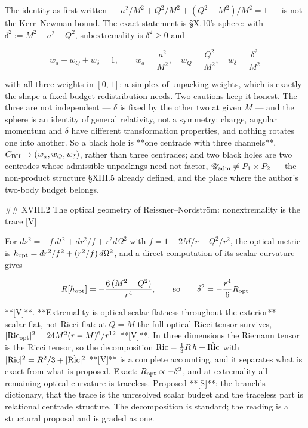 The identity as first written — $a^2/M^2+Q^2/M^2+(Q^2-M^2)/M^2 = 1$ — is not the Kerr–Newman bound. The exact statement is §X.10's sphere: with $\delta^2 := M^2-a^2-Q^2$, subextremality is $\delta^2\geq0$ and

$$w_a+w_Q+w_\delta = 1,\qquad w_a = \frac{a^2}{M^2},\quad w_Q = \frac{Q^2}{M^2},\quad w_\delta = \frac{\delta^2}{M^2}$$

with all three weights in $[0,1]$: a simplex of unpacking weights, which is exactly the shape a fixed-budget redistribution needs. Two cautions keep it honest. The three are not independent — $\delta$ is fixed by the other two at given $M$ — and the sphere is an identity of general relativity, not a symmetry: charge, angular momentum and $\delta$ have different transformation properties, and nothing rotates one into another. So a black hole is **one centrade with three channels**, $C_{\rm BH}\mapsto(w_a,w_Q,w_\delta)$, rather than three centrades; and two black holes are two centrades whose admissible unpackings need not factor, $\mathscr U_{\rm adm}\neq P_1\times P_2$ — the non-product structure §XIII.5 already defined, and the place where the author's two-body budget belongs.

## XVIII.2 The optical geometry of Reissner–Nordström: nonextremality is the trace [V]

For $ds^2 = -f\,dt^2+dr^2/f+r^2d\Omega^2$ with $f = 1-2M/r+Q^2/r^2$, the optical metric is $h_{\rm opt} = dr^2/f^2+(r^2/f)\,d\Omega^2$, and a direct computation of its scalar curvature gives

$$R[h_{\rm opt}] = -\frac{6\,(M^2-Q^2)}{r^4},\qquad\text{so}\qquad \delta^2 = -\frac{r^4}{6}R_{\rm opt}$$

**[V]**. **Extremality is optical scalar-flatness throughout the exterior** — scalar-flat, not Ricci-flat: at $Q = M$ the full optical Ricci tensor survives, $|{\rm Ric}_{\rm opt}|^2 = 24M^2(r-M)^6/r^{12}$ **[V]**. In three dimensions the Riemann tensor is the Ricci tensor, so the decomposition ${\rm Ric} = \tfrac13R\,h+\mathring{\rm Ric}$ with $|{\rm Ric}|^2 = R^2/3+|\mathring{\rm Ric}|^2$ **[V]** is a complete accounting, and it separates what is exact from what is proposed. Exact: $R_{\rm opt}\propto-\delta^2$, and at extremality all remaining optical curvature is traceless. Proposed **[S]**: the branch's dictionary, that the trace is the unresolved scalar budget and the traceless part is relational centrade structure. The decomposition is standard; the reading is a structural proposal and is graded as one.

